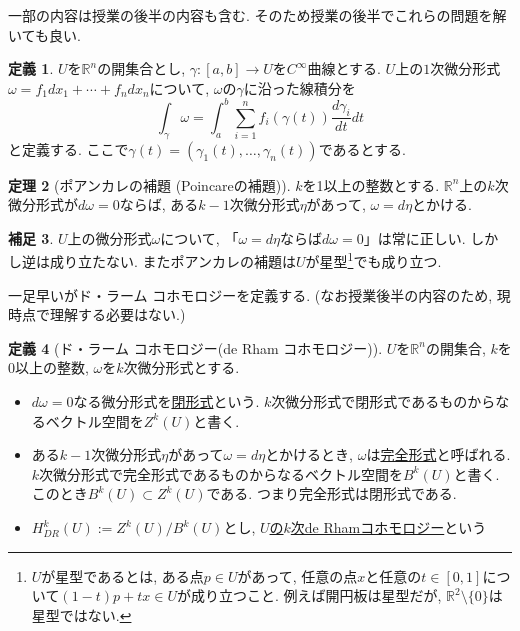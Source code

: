 \documentclass[dvipdfmx,a4paper,11pt]{article}
\newcommand{\R}{\mathbb{R}}
\theoremstyle{definition}
\newtheorem{thm}{定理}
\newtheorem{dfn}[thm]{定義}
\newtheorem{rem}[thm]{補足}
\newcommand{\drv}[2]{\frac{d #1}{d#2}}
\begin{document}
一部の内容は授業の後半の内容も含む.  そのため授業の後半でこれらの問題を解いても良い. 


 \begin{tcolorbox}[
    colback = white,
    colframe = green!35!black,
    fonttitle = \bfseries,
    breakable = true]
\begin{dfn}
$U$を$\R^n$の開集合とし, $\gamma : [a,b] \to U$を$C^\infty$曲線とする. 
$U$上の$1$次微分形式$\omega = f_1 dx_1 + \cdots + f_n dx_n$について, $\omega$の$\gamma$に沿った線積分を
    $$
\int_{\gamma} \omega = \int_{a}^{b} \sum_{i=1}^{n} f_i (\gamma (t)) \drv{\gamma_i}{t} dt
    $$
と定義する. ここで$\gamma(t) = (\gamma_1 (t), \ldots, \gamma_n(t))$であるとする. 
   \end{dfn}
    \end{tcolorbox}
    
 \begin{tcolorbox}[
    colback = white,
    colframe = green!35!black,
    fonttitle = \bfseries,
    breakable = true]
\begin{thm}[ポアンカレの補題 (Poincareの補題)]
$k$を1以上の整数とする. $\R^n$上の$k$次微分形式が$d \omega=0$ならば, ある$k-1$次微分形式$\eta$があって, $\omega = d \eta$とかける.  
   \end{thm}
    \end{tcolorbox}
\begin{rem}
$U$上の微分形式$\omega$について, 「$\omega = d\eta$ならば$d \omega=0$」は常に正しい. しかし逆は成り立たない. またポアンカレの補題は$U$が星型\footnote{$U$が星型であるとは, ある点$p \in U$があって, 任意の点$x$と任意の$t \in [0,1]$について$(1-t)p + t x \in U$が成り立つこと. 例えば開円板は星型だが, $\R^2 \setminus \{ 0\}$は星型ではない.}でも成り立つ. 
\end{rem}
 
 一足早いがド・ラーム コホモロジーを定義する. (なお授業後半の内容のため, 現時点で理解する必要はない.)
 
 \begin{tcolorbox}[
    colback = white,
    colframe = green!35!black,
    fonttitle = \bfseries,
    breakable = true]
\begin{dfn}[ド・ラーム コホモロジー(de Rham コホモロジー)]
$U$を$\R^n$の開集合, $k$を0以上の整数, $\omega$を$k$次微分形式とする. 
\begin{itemize}
 \setlength{\parskip}{0cm}
  \setlength{\itemsep}{2pt}
\item  $d\omega=0$なる微分形式を\underline{閉形式}という. $k$次微分形式で閉形式であるものからなるベクトル空間を$Z^k(U)$と書く. 
\item ある$k-1$次微分形式$\eta$があって$\omega = d \eta$とかけるとき, $\omega$は\underline{完全形式}と呼ばれる. $k$次微分形式で完全形式であるものからなるベクトル空間を$B^k(U)$と書く. このとき$B^k(U) \subset Z^k (U)$である. つまり完全形式は閉形式である. 
\item $H^{k}_{DR}(U) := Z^k (U)/B^k(U)$とし, \underline{$U$の$k$次de Rhamコホモロジー}という
 \end{itemize}
\end{dfn}
\end{tcolorbox}  
\end{document}
